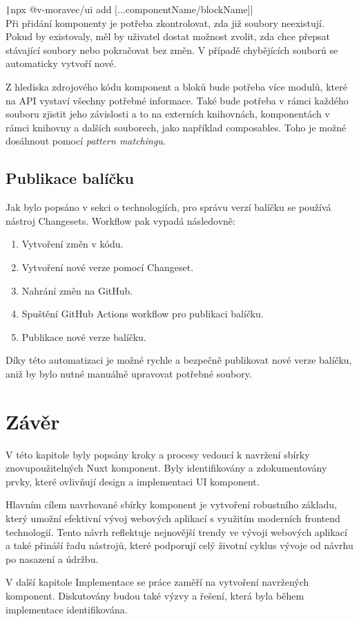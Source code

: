 \texttt|npx @v-moravec/ui add [...componentName/blockName]|\\

Při přidání komponenty je potřeba zkontrolovat, zda již soubory neexistují. Pokud by existovaly, měl by uživatel dostat možnost zvolit, zda chce přepsat stávající soubory nebo pokračovat bez změn. V případě chybějících souborů se automaticky vytvoří nové.

Z hlediska zdrojového kódu komponent a bloků bude potřeba více modulů, které na API vystaví všechny potřebné informace. Také bude potřeba v rámci každého souboru zjistit jeho závislosti a to na externích knihovnách, komponentách v rámci knihovny a dalších souborech, jako například composables. Toho je možné dosáhnout pomocí \emph{pattern matchingu}.

\subsection{Publikace balíčku}
Jak bylo popsáno v sekci o technologiích, pro správu verzí balíčku se používá nástroj Changesets. Workflow pak vypadá následovně:

\begin{enumerate}
  \item Vytvoření změn v kódu.
  \item Vytvoření nové verze pomocí Changeset.
  \item Nahrání změn na GitHub.
  \item Spuštění GitHub Actions workflow pro publikaci balíčku.
  \item Publikace nové verze balíčku.
\end{enumerate}

Díky této automatizaci je možné rychle a bezpečně publikovat nové verze balíčku, aniž by bylo nutné manuálně upravovat potřebné soubory.

\section{Závěr}
V této kapitole byly popsány kroky a procesy vedoucí k navržení sbírky znovupoužitelných Nuxt komponent. Byly identifikovány a zdokumentovány prvky, které ovlivňují design a implementaci UI komponent.

Hlavním cílem navrhované sbírky komponent je vytvoření robustního základu, který umožní efektivní vývoj webových aplikací s využitím moderních frontend technologií. Tento návrh reflektuje nejnovější trendy ve vývoji webových aplikací a také přináší řadu nástrojů, které podporují celý životní cyklus vývoje od návrhu po nasazení a údržbu.

V další kapitole Implementace se práce zaměří na vytvoření navržených komponent. Diskutovány budou také výzvy a řešení, která byla během implementace identifikována.


